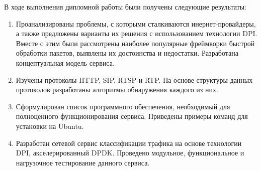 \Conclusion
В ходе выполнения дипломной работы были получены следующие результаты:
\begin{enumerate}
\item Проанализированы проблемы, с которыми сталкиваются инернет-провайдеры, а также предложены варианты их решения с использованием технологии DPI. Вместе с этим были рассмотрены наиболее популярные фреймворки быстрой обработки пакетов, выявлены их достоинства и недостатки. Разработана концептуальная модель сервиса.
\item Изучены протоколы HTTP, SIP, RTSP и RTP. На основе структуры данных протоколов разработаны алгоритмы обнаружения каждого из них.
\item Сформулирован список программного обеспечения, необходимый для полноценного функционирования сервиса. Приведены примеры команд для установки на Ubuntu.
\item Разработан сетевой сервис классификации трафика на основе технологии DPI, акселерированный DPDK. Проведено модульное, функциональное и нагрузочное тестирование данного сервиса.
\end{enumerate}


